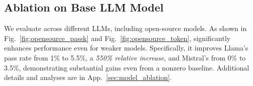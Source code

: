 


\subsection{Ablation on Base LLM Model}

We evaluate \decomp across different LLMs, including open-source models. As shown in Fig.~\ref{fig:opensource_passk} and Fig.~\ref{fig:opensource_token}, \decomp significantly enhances performance even for weaker models. Specifically, it improves Llama's pass rate from 1\% to 5.5\%, a \emph{550\% relative increase}, and Mistral’s from 0\% to 3.5\%, demonstrating substantial gains even from a nonzero baseline. Additional details and analyses are in App.~\ref{sec:model_ablation}.

